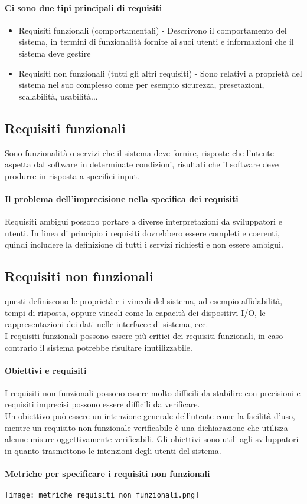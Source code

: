 \paragraph*{Ci sono due tipi principali di requisiti}
\begin{itemize}
    \item Requisiti funzionali (comportamentali) - Descrivono il comportamento del
    sistema, in termini di funzionalità fornite ai suoi utenti e informazioni
    che il sistema deve gestire
    \item Requisiti non funzionali (tutti gli altri requisiti) - Sono relativi
    a proprietà del sistema nel suo complesso come per esempio sicurezza, presetazioni,
    scalabilità, usabilità...
\end{itemize}
\subsection{Requisiti funzionali}
Sono funzionalità o servizi che il sistema deve fornire, risposte che l'utente
aspetta dal software in determinate condizioni, risultati che il software deve produrre
in risposta a specifici input.
\paragraph{Il problema dell'imprecisione nella specifica dei requisiti}
Requisiti ambigui possono portare a diverse interpretazioni da sviluppatori e utenti.
In linea di principio i requisiti dovrebbero essere completi e coerenti, quindi
includere la definizione di tutti i servizi richiesti e non essere ambigui.
\subsection{Requisiti non funzionali}
questi definiscono le proprietà e i vincoli del sistema, ad esempio affidabilità,
tempi di risposta, oppure vincoli come la capacità dei dispositivi I/O,
le rappresentazioni dei dati nelle interfacce di sistema, ecc.
\\I requisiti funzionali possono essere più critici dei requisiti funzionali, in caso
contrario il sistema potrebbe risultare inutilizzabile.
\paragraph*{Obiettivi e requisiti} I requisiti non funzionali possono essere molto
difficili da stabilire con precisioni e requisiti imprecisi possono essere
difficili da verificare.
\\ Un obiettivo può essere un intenzione generale dell'utente come la facilità d'uso,
mentre un requisito non funzionale verificabile è una dichiarazione che utilizza
alcune misure oggettivamente verificabili.
Gli obiettivi sono utili agli sviluppatori in quanto trasmettono le intenzioni degli
utenti del sistema.
\paragraph*{Metriche per specificare i requisiti non funzionali}
\begin{center}
    \texttt{[image: metriche\_requisiti\_non\_funzionali.png]}
\end{center}

